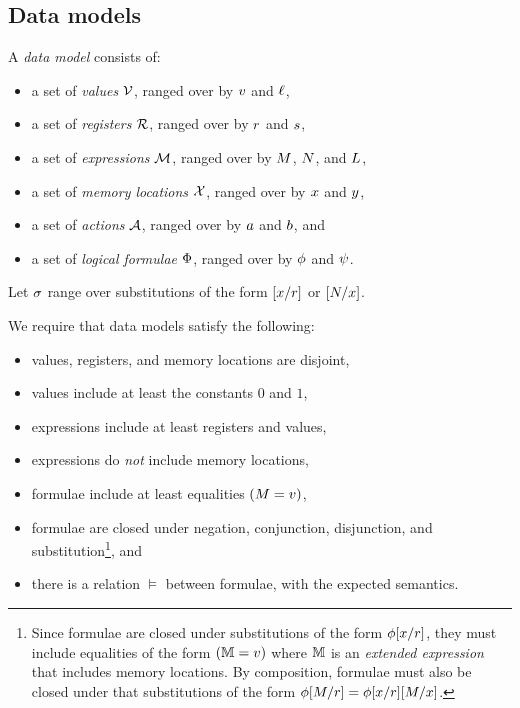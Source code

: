 \subsection{Data models}
\label{sec:data:models}
A \emph{data model} consists of:
\begin{itemize}
\item a set of \emph{values} $\mathcal{V}$, ranged over by
  $v$ and $\ell$,
\item a set of \emph{registers} $\mathcal{R}$, ranged over by
  $r$ and $s$,
\item a set of \emph{expressions} $\mathcal{M}$, ranged over by
  $M$, $N$, and $L$, %
\item a set of \emph{memory locations} $\mathcal{X}$, ranged over by $x$ and
  $y$, 
\item a set of \emph{actions} $\mathcal{A}$, ranged over by $a$ and $b$, and
\item a set of \emph{logical formulae} $\Phi$, ranged over by
  $\phi$ and $\psi$.
\end{itemize}

Let $\sigma$ range over substitutions of the form
$[x/r]$ or $[N/x]$.

We require that data models satisfy the following:
\begin{itemize}
\item values, registers, and memory locations are disjoint,
\item values include at least the constants $0$ and $1$,
\item expressions include at least registers and values,
\item expressions do \emph{not} include memory locations, %
\item formulae include at least %
  equalities %
  $(M=v)$, %
\item formulae are closed under negation, conjunction, disjunction, and
  substitution\footnote{Since formulae are closed under substitutions of the
    form $\phi[x/r]$, they must include equalities of the form
    $(\mathbb{M}=v)$ where $\mathbb{M}$ is an \emph{extended expression} that
    includes memory locations.  By composition, formulae must also be closed
    under that substitutions of the form
    $\phi[M/r]=\phi[x/r][M/x]$.}, and
\item there is a relation $\vDash$ between formulae, with the expected semantics.
\end{itemize}

